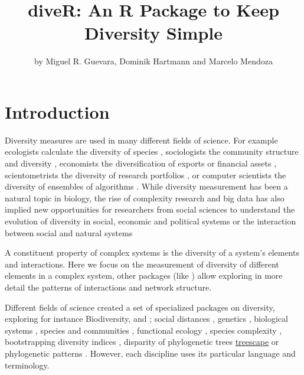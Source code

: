\title{diveR: An R Package to Keep Diversity Simple}
\author{by Miguel R. Guevara, Dominik Hartmann and Marcelo Mendoza}

\maketitle



\section{Introduction}
Diversity measures are used in many different fields of science. For example ecologists calculate the diversity of species \citep{forey_systematics_1994}, sociologists the community structure and diversity \citep{haughton_economic_1995}, economists the diversification of exports or financial assets \citep{hidalgo_product_2007}, scientometrists the diversity of research portfolios \citep{rafols_knowledge_2014}, or computer scientists the diversity of ensembles of algorithms \citep{kuncheva_measures_2003}. While diversity measurement has been a natural topic in biology, the rise of complexity research and big data has also implied new opportunities for researchers from social sciences to understand the evolution of diversity in social, economic and political systems or the interaction between social and natural systems

A constituent property of complex systems is the diversity of a system’s elements and interactions. Here we focus on the measurement of diversity of different elements in a complex system, other packages (like ) allow exploring in more detail the patterns of interactions and network structure. 

Different fields of science created a set of specialized packages on diversity, exploring for instance  Biodiversity,  and ; social distances , genetics , biological systems , species and communities , functional ecology , species complexity , bootstrapping diversity indices , disparity of phylogenetic trees \href{https://github.com/thibautjombart/treescape}{treescape} or phylogenetic patterns . However, each discipline uses its particular language and terminology.


